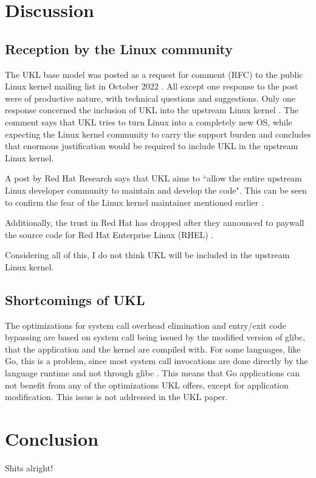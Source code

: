 \documentclass[10pt,twocolumn,a4paper]{article}
\begin{document}
\section{Discussion}\label{sec:discussion}
  \subsection{Reception by the Linux community}
    The UKL base model was posted as a request for comment (RFC) to the public Linux
    kernel mailing list in October 2022 \cite{ukl-rfc-lwn}.
    All except one response to the post were of productive nature, with technical questions
    and suggestions. 
    Only one response concerned the inclusion of UKL into the upstream Linux kernel 
    \cite{ukl-rfc-negative}.
    The comment says that UKL tries to turn Linux into a completely new OS, while expecting 
    the Linux kernel community to carry the support burden and concludes that enormous
    justification would be required to include UKL in the upstream Linux kernel.

    A post by Red Hat Research \cite{ukl-redhat-post} says that UKL aims to ``allow 
    the entire upstream Linux developer community to maintain and develop the code".
    This can be seen to confirm the fear of the Linux kernel maintainer mentioned earlier
    \cite{ukl-rfc-negative}.

    Additionally, the trust in Red Hat has dropped after they announced to paywall the
    source code for Red Hat Enterprise Linux (RHEL) \cite{redhat-fuckup}.

    Considering all of this, I do not think UKL will be included in the upstream
    Linux kernel.

  \subsection{Shortcomings of UKL}
    The optimizations for system call overhead elimination and entry/exit code bypassing
    are based on system call being issued by the modified version of glibc, that
    the application and the kernel are compiled with.
    For some languages, like Go, this is a problem, since most system call invocations
    are done directly by the language runtime and not through glibc \cite{ukl-vs-unicraft}.
    This means that Go applications can not benefit from any of the optimizations UKL offers,
    except for application modification.
    This issue is not addressed in the UKL paper.

\section{Conclusion}
  Shits alright!



\end{document}

